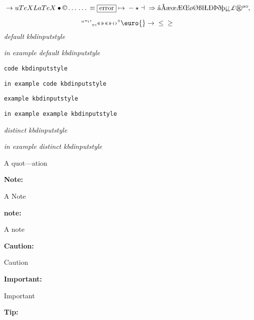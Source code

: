 \documentclass{book}
\begin{document}
$$
\rightarrow{}
u
TeX LaTeX \bullet{} \copyright{} \dots{} \dots{} \equiv{}
\fbox{error} \mapsto{} - \star{} \dashv{} \Rightarrow{}
\mathord{\text{\aa{}}} \mathord{\text{\AA{}}} \mathord{\text{\ae{}}} \mathord{\text{\oe{}}} \mathord{\text{\AE{}}} \mathord{\text{\OE{}}} \mathord{\text{\o{}}} \mathord{\text{\O{}}} \mathord{\text{\ss{}}} \mathord{\text{\l{}}} \mathord{\text{\L{}}} \mathord{\text{\DH{}}}
\mathord{\text{\TH{}}} \mathord{\text{\dh{}}} \mathord{\text{\th{}}} \mathord{\text{\textexclamdown{}}} \mathord{\text{\textquestiondown{}}} \mathsterling{}
\circledR{} \mathord{\text{\textordfeminine{}}} \mathord{\text{\textordmasculine{}}} , 
$$


$$
\mathord{\text{\textquotedblleft{}}} \mathord{\text{\textquotedblright{}}} 
\mathord{\text{\textquoteleft{}}} \mathord{\text{\textquoteright{}}} \mathord{\text{\quotedblbase{}}} \mathord{\text{\quotesinglbase{}}} \mathord{\text{\guillemotleft{}}}
\mathord{\text{\guillemotright{}}} \mathord{\text{\guillemotleft{}}} \mathord{\text{\guillemotright{}}} \mathord{\text{\guilsinglleft{}}}
\mathord{\text{\guilsinglright{}}} ^{\circ{}} \euro{} \rightarrow{} \leq{} \geq{}
$$
{\ttfamily\textsl{default kbdinputstyle}}


{\ttfamily\textsl{in example default kbdinputstyle}}


\texttt{code kbdinputstyle}


\texttt{in example code kbdinputstyle}


\texttt{example kbdinputstyle}


\texttt{in example example kbdinputstyle}


{\ttfamily\textsl{distinct kbdinputstyle}}


{\ttfamily\textsl{in example distinct kbdinputstyle}}




A quot---ation




\textbf{Note:} 

A Note




\textbf{note:} 

A note




\textbf{Caution:} 

Caution




\textbf{Important:} 

Important




\textbf{Tip:} 
\end{document}
